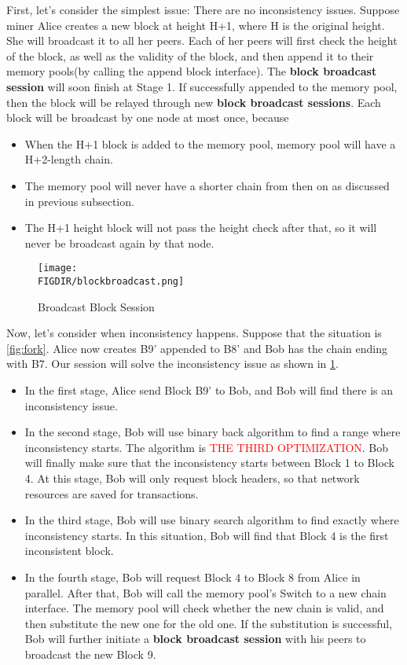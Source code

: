 \documentclass{article}
\begin{document}
\begin{spacing}{1.1}
First, let's consider the simplest issue: There are no inconsistency issues. Suppose miner Alice creates a new block at height H+1, where H is the original height. She will broadcast it to all her peers. Each of her peers will first check the height of the block, as well as the validity of the block, and then append it to their memory pools(by calling the append block interface). The \textbf{block broadcast session} will soon finish at Stage 1. If successfully appended to the memory pool, then the block will be relayed through new \textbf{block broadcast sessions}. Each block will be broadcast by one node at most once, because 
\begin{itemize}
    \setlength{\itemsep}{1pt}
    \item When the H+1 block is added to the memory pool, memory pool will have a H+2-length chain.
    \item The memory pool will never have a shorter chain from then on as discussed in previous subsection.
    \item The H+1 height block will not pass the height check after that, so it will never be broadcast again by that node.
\end{itemize}

\begin{figure}[htbp]
    \centering
    \texttt{[image: \\FIGDIR/blockbroadcast.png]}
    \caption{Broadcast Block Session}
    \label{fig:blockbroadcast}
\end{figure}

Now, let's consider when inconsistency happens. Suppose that the situation is \cref{fig:fork}. Alice now creates B9' appended to B8' and Bob has the chain ending with B7. Our session will solve the inconsistency issue as shown in \cref{fig:blockbroadcast}. 
\begin{itemize}
    \setlength{\itemsep}{1pt}
    \item In the first stage, Alice send Block B9' to Bob, and Bob will find there is an inconsistency issue.
    \item In the second stage, Bob will use binary back algorithm to find a range where inconsistency starts. The algorithm is \textcolor{red}{THE THIRD OPTIMIZATION}. Bob will finally make sure that the inconsistency starts between Block 1 to Block 4. At this stage, Bob will only request block headers, so that network resources are saved for transactions.
    \item In the third stage, Bob will use binary search algorithm to find exactly where inconsistency starts. In this situation, Bob will find that Block 4 is the first inconsistent block. 
    \item In the fourth stage, Bob will request Block 4 to Block 8 from Alice in parallel. After that, Bob will call the memory pool's Switch to a new chain interface. The memory pool will check whether the new chain is valid, and then substitute the new one for the old one. If the substitution is successful, Bob will further initiate a \textbf{block broadcast session} with his peers to broadcast the new Block 9.
\end{itemize}


\end{spacing}
\end{document}
